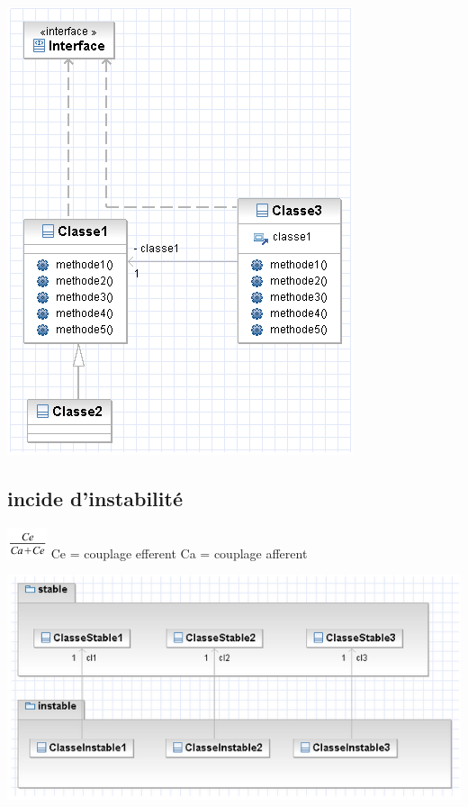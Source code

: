 \documentclass[french]{beamer}%
\begin{document}
			\begin{frame}
				\begin{center}
					\includegraphics[scale=0.35]{speGraph2}
				\end{center}
			\end{frame}
		
		\subsection{incide d'instabilité}
		
			\begin{frame}
				\begin{center}
					\includegraphics[scale=1]{instFormule}
					\newline
					Ce = couplage efferent
					\newline
					Ca = couplage afferent
				\end{center}
			\end{frame}
		
			\begin{frame}
				\begin{center}
					\includegraphics[scale=0.45]{instGraph}
				\end{center}
			\end{frame}
		
\end{document}

